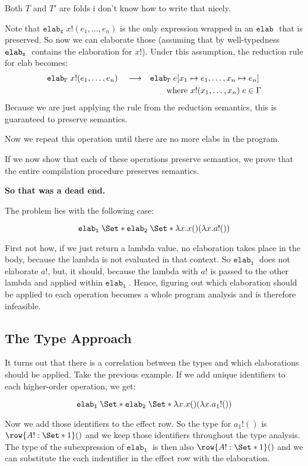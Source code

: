 \documentclass{article}
\newcommand\kw[1]{\mathbf{\mathtt{#1}}\;}
\newcommand\elab[2][]{\kw{elab_{#1}}#2}
\renewcommand\S{\Set*}
\begin{document}
Both $T$ and $T'$ are folds i don't know how to write that nicely.

Note that $\elab[x]{x!(e_1,\dots,e_n)}$ is the only expression wrapped in an $\elab\!\!$ that is preserved. So now we can elaborate those (assuming that by well-typedness $\elab[x]$ contains the elaboration for $x!$). Under this assumption, the reduction rule for elab becomes:
\begin{align*}
    \elab[\Gamma]{x!(e_1, \dots, e_n)} \reduce& \elab[\Gamma]{e[x_1\mapsto e_1, \dots, x_n\mapsto e_n]}\\
    &\qquad\text{where } x!(x_1, \dots, x_n)\;e \in \Gamma
\end{align*}
Because we are just applying the rule from the reduction semantics, this is guaranteed to preserve semantics.

Now we repeat this operation until there are no more elabs in the program.

If we now show that each of these operations preserve semantics, we prove that the entire compilation procedure preserves semantics.

\textbf{So that was a dead end.}

The problem lies with the following case:

\[
    \elab[1]{\S{\elab[2]{\S{\lambda x. x()}}(\lambda x. a!())}}
\]

First not how, if we just return a lambda value, no elaboration takes place in the body, because the lambda is not evaluated in that context. So $\elab[1]{}$ does not elaborate $a!$, but, it should, because the lambda with $a!$ is passed to the other lambda and applied within $\elab[1]{}$. Hence, figuring out which elaboration should be applied to each operation becomes a whole program analysis and is therefore infeasible.

\subsection{The Type Approach}

It turns out that there is a correlation between the types and which elaborations should be applied. Take the previous example. If we add unique identifiers to each higher-order operation, we get:

\[
    \elab[1]{\S{\elab[2]{\S{\lambda x. x()}}(\lambda x. a_1!())}}
\]

Now we add those identifiers to the effect row. So the type for $a_1!()$ is $\row{A!: \S{1}} ()$ and we keep those identifiers throughout the type analysis. The type of the subexpression of $\elab[1]{}$ is then also $\row{A!: \S{1}} ()$ and we can substitute the each indentifier in the effect row with the elaboration.
\end{document}
